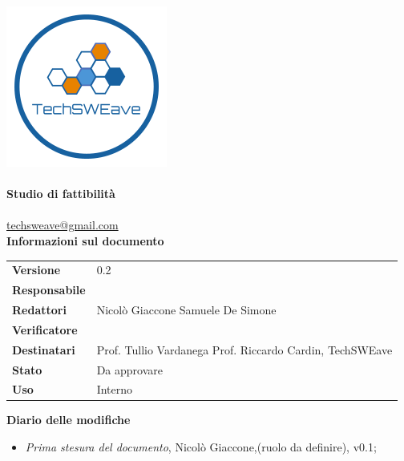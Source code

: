 \documentclass[a4paper]{article}
\begin{document}
\begin{titlepage}
    \begin{center}
        \includegraphics{../../../Images/logo}\\
        \vspace{20px}
        \textcolor{logo}{\hrulefill}\\
        \vspace{20px}
        \textbf{\huge\textcolor{logo}{Studio di fattibilità}}\\
        \vspace{10px}
        \textcolor{logo}{\hrulefill}\\
        \vspace{20px}
        \href{mailto:techsweave@gmail.com}{techsweave@gmail.com}\\
        \vspace{40px}
        \textbf{Informazioni sul documento}\\
        \vspace{20px}
        \begin{tabular}{p{100px} | p{100px}}
            \textbf{Versione} & 0.2\\
            \textbf{Responsabile} & \\
            \textbf{Redattori} & Nicolò Giaccone \newline Samuele De Simone\\
            \textbf{Verificatore} & \\
            \textbf{Destinatari} & Prof. Tullio Vardanega \newline Prof. Riccardo Cardin, \newline TechSWEave\\
            \textbf{Stato} & Da approvare\\
            \textbf{Uso} & Interno\\
        \end{tabular}
            \vspace{1ex}

    \end{center}
    \end{titlepage}
    \begin{center}
       \textbf{Diario delle modifiche}
        \begin{itemize}
            \item \textit{Prima stesura del documento}, Nicolò Giaccone,(ruolo da definire), v0.1;
        \end{itemize}
    \end{center}
    \newpage
\tableofcontents
\newpage








\end{document}
